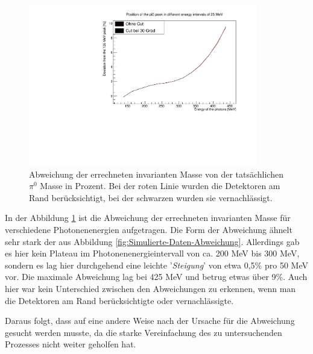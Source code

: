 \documentclass[a4paper,11pt,oneside,final,german,openbib,pdftex]{scrbook}
\begin{document}
{\begin{figure}[h!]
	\begin{center}
		\includegraphics[width=100mm]{20171204DeviationUrsprungIsotrop}
	\end{center}
\caption{Abweichung der errechneten invarianten Masse von der tatsächlichen $\pi^0$ Masse in Prozent. Bei der roten Linie wurden die Detektoren am Rand berücksichtigt, bei der schwarzen wurden sie vernachlässigt.}
\label{fig:Pi0-Ursprung-Relative-Abweichung}
\end{figure}

In der Abbildung \ref{fig:Pi0-Ursprung-Relative-Abweichung} ist die Abweichung der errechneten invarianten Masse für verschiedene Photonenenergien aufgetragen. Die Form der Abweichung ähnelt sehr stark der aus Abbildung \ref{fig:Simulierte-Daten-Abweichung}. Allerdings gab es hier kein Plateau im Photonenenergieintervall von ca. 200 MeV bis 300 MeV, sondern es lag hier durchgehend eine leichte '\textit{Steigung}' von etwa 0,5\% pro 50 MeV vor. Die maximale Abweichung lag bei 425 MeV und betrug etwas über 9\%. Auch hier war kein Unterschied zwischen den Abweichungen zu erkennen, wenn man die Detektoren am Rand berücksichtigte oder vernachlässigte. 

Daraus folgt, dass auf eine andere Weise nach der Ursache für die Abweichung gesucht werden musste, da die starke Vereinfachung des zu untersuchenden Prozesses nicht weiter geholfen hat.


}
\end{document}
